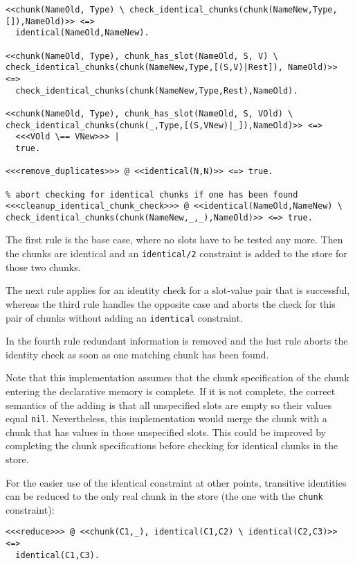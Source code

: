 \begin{lstlisting}
<<chunk(NameOld, Type) \ check_identical_chunks(chunk(NameNew,Type,[]),NameOld)>> <=> 
  identical(NameOld,NameNew).
  
<<chunk(NameOld, Type), chunk_has_slot(NameOld, S, V) \ check_identical_chunks(chunk(NameNew,Type,[(S,V)|Rest]), NameOld)>> <=> 
  check_identical_chunks(chunk(NameNew,Type,Rest),NameOld).
  
<<chunk(NameOld, Type), chunk_has_slot(NameOld, S, VOld) \ check_identical_chunks(chunk(_,Type,[(S,VNew)|_]),NameOld)>> <=> 
  <<<VOld \== VNew>>> |
  true.
    
<<<remove_duplicates>>> @ <<identical(N,N)>> <=> true.

% abort checking for identical chunks if one has been found
<<<cleanup_identical_chunk_check>>> @ <<identical(NameOld,NameNew) \ check_identical_chunks(chunk(NameNew,_,_),NameOld)>> <=> true.
\end{lstlisting}

The first rule is the base case, where no slots have to be tested any more. Then the chunks are identical and an \lstinline|identical/2| constraint is added to the store for those two chunks.

The next rule applies for an identity check for a slot-value pair that is successful, whereas the third rule handles the opposite case and aborts the check for this pair of chunks without adding an \lstinline|identical| constraint.

In the fourth rule redundant information is removed and the lust rule aborts the identity check as soon as one matching chunk has been found.

Note that this implementation assumes that the chunk specification of the chunk entering the declarative memory is complete. If it is not complete, the correct semantics of the adding is that all unspecified slots are empty so their values equal \lstinline|nil|. Nevertheless, this implementation would merge the chunk with a chunk that has values in those unspecified slots. This could be improved by completing the chunk specifications before checking for identical chunks in the store.

For the easier use of the identical constraint at other points, transitive identities can be reduced to the only real chunk in the store (the one with the \lstinline|chunk| constraint):

\begin{lstlisting}
<<<reduce>>> @ <<chunk(C1,_), identical(C1,C2) \ identical(C2,C3)>> <=> 
  identical(C1,C3).
\end{lstlisting}

